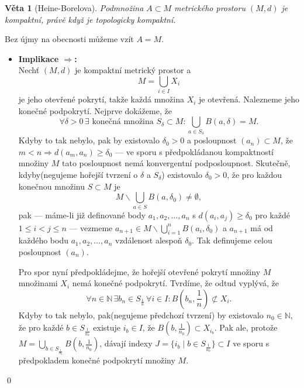 \documentclass[11pt]{article}
\theoremstyle{nontheoremstyle}
\renewenvironment{proof}{{\noindent\bfseries Důkaz:}}{\qed}
\theoremstyle{nontheoremstylenodot}
\theoremstyle{theoremstyle}
\newtheorem*{theorem}{Věta}
\begin{document}
\begin{theorem}[Heine-Borelova]
    Podmnožina $A\subset M$ metrického prostoru $(M,d)$ je kompaktní, právě když je topologicky kompaktní.
\end{theorem}
\begin{proof}
    Bez újmy na obecnosti můžeme vzít $A = M$.
    \begin{itemize}
        \item {
            \textbf{Implikace $\Rightarrow$:}\\
            Nechť $(M,d)$ je kompaktní metrický prostor a \[ M = \bigcup_{i\in I} X_i \]
            je jeho otevřené pokrytí, takže každá množina $X_i$ je otevřená.
            Nalezneme jeho konečné podpokrytí. Nejprve dokážeme, že
            \[ \forall \delta > 0 \, \exists \,\, \text{konečná množina} \,\, S_{\delta} \subset M: \bigcup_{a\in S_{\delta}} B(a,\delta) = M. \]
            Kdyby to tak nebylo, pak by existovalo $\delta_0 > 0$ a posloupnost $(a_n) \subset M$, že $m < n \Rightarrow d(a_m,a_n) \geq \delta_0$
            --- ve sporu s předpokládanou kompaktností množiny $M$ tato posloupnost nemá konvergentní podposloupnost.
            Skutečně, kdyby(negujeme hořejší tvrzení o $\delta$ a $S_\delta$) existovalo $\delta_0 > 0$, že pro každou konečnou
            množinu $S\subset M$ je
            \[ M \backslash \bigcup_{a\in S} B(a,\delta_0) \neq \emptyset, \]
            pak --- máme-li již definované body $a_1,a_2,\dots,a_n$ s $d(a_i, a_j) \geq \delta_0$ pro každé
            $1 \leq i < j \leq n$ --- vezmeme $a_{n+1} \in M\backslash \bigcup_{i=1}^{n} B(a_i, \delta_0)$
            a $a_{n+1}$ má od každého bodu $a_1,a_2,\dots, a_n$ vzdálenost alespoň $\delta_0$.
            Tak definujeme celou posloupnost $(a_n)$.

            Pro spor nyní předpokládejme, že hořejší otevřené pokrytí množiny $M$ množinami $X_i$ nemá konečné podpokrytí.
            Tvrdíme, že odtud vyplývá, že \[ \forall n \in\mathbb{N} \, \exists b_n \in S_{\frac{1}{n}} \, \forall i \in I: B\left(b_n, \frac{1}{n}\right) \not\subset X_i. \]
            Kdyby to tak nebylo, pak(negujeme předchozí tvrzení) by existovalo $n_0 \in\mathbb{N}$, že pro každé $b\in S_{\frac{1}{n_0}}$ existuje $i_b \in I$, že
            $B\left(b,\frac{1}{n_0} \right) \subset X_{i_b}$. Pak ale, protože $M = \bigcup_{b\in S_{\frac{1}{n_0}}} B\left( b, \frac{1}{n_0} \right)$, dávají
            indexy $J = \{ i_b \mid b\in S_{\frac{1}{n_0}} \} \subset I$ ve sporu s předpokladem konečné podpokrytí množiny $M$.

}
\end{itemize}
\end{proof}
\end{document}
